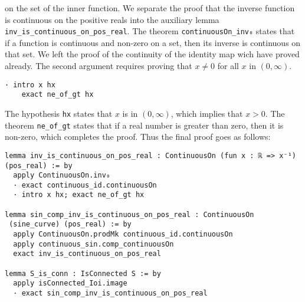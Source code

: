 on the set of the inner function.
We separate the proof that the inverse function is continuous on the positive reals
into the auxiliary lemma \lstinline[language=lean]|inv_is_continuous_on_pos_real|.
The theorem \lstinline[language=lean]|continuousOn_inv₀| states that if a function
is continuous and non-zero on a set, then its inverse is continuous on that set.
We left the proof of the continuity of the identity map wich have proved already.
The second argument requires proving that $x \neq 0$ for all $x$ in $(0, \infty)$.
\begin{lstlisting}[language=lean]
  · intro x hx
    exact ne_of_gt hx
\end{lstlisting}
The hypothesis \lstinline[language=lean]|hx| states that $x$ is in $(0, \infty)$,
which implies that $x > 0$.
The theorem \lstinline[language=lean]|ne_of_gt| states that if a real number is greater than zero,
then it is non-zero, which completes the proof.
Thus the final proof goes as follows:
\begin{lstlisting}[language=lean]
lemma inv_is_continuous_on_pos_real : ContinuousOn (fun x : ℝ => x⁻¹) (pos_real) := by
  apply ContinuousOn.inv₀
  · exact continuous_id.continuousOn
  · intro x hx; exact ne_of_gt hx

lemma sin_comp_inv_is_continuous_on_pos_real : ContinuousOn
 (sine_curve) (pos_real) := by
  apply ContinuousOn.prodMk continuous_id.continuousOn
  apply continuous_sin.comp_continuousOn
  exact inv_is_continuous_on_pos_real

lemma S_is_conn : IsConnected S := by
  apply isConnected_Ioi.image 
  · exact sin_comp_inv_is_continuous_on_pos_real
\end{lstlisting}

